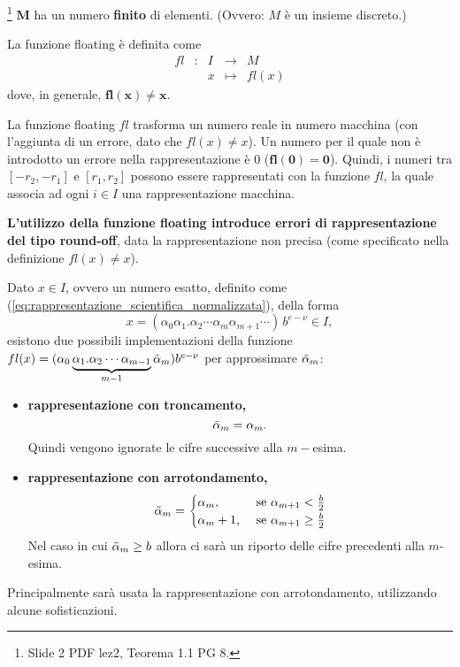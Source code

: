 \begin{theorem}\footnote{Slide 2 PDF lez2, Teorema 1.1 PG 8.}
	$\boldsymbol M$ ha un numero \textbf{finito} di elementi. (Ovvero: $M$ è un insieme discreto.)
\end{theorem}

\begin{definition}
	La funzione floating è definita come
	\begin{equation*}
		\begin{matrix}
			fl&:&I&\rightarrow& M\\
			&&x&\mapsto& fl(x)
		\end{matrix}
	\end{equation*}
	dove, in generale, $\boldsymbol{fl(x)\neq x}$. 
\end{definition}

La funzione floating $fl$ trasforma un numero reale in numero macchina (con l'aggiunta di un errore, dato che $fl(x)\neq x$). Un numero per il quale non è introdotto un errore nella rappresentazione è 0 ($\boldsymbol{fl(0)=0}$). Quindi, i numeri tra $[-r_2,-r_1]$ e $[r_1,r_2]$ possono essere rappresentati con la funzione $fl$, la quale associa ad ogni $i\in I$ una rappresentazione macchina. 

\textbf{L'utilizzo della funzione floating introduce errori di rappresentazione del tipo round-off}, data la rappresentazione non precisa (come specificato nella definizione $fl(x)\neq x$).

Dato $x\in I$, ovvero un numero esatto, definito come (\ref{eq:rappresentazione_scientifica_normalizzata}), della forma 
\begin{equation}\label{eq:numEsatto}
	x=(\alpha_0\alpha_1.\alpha_2\cdots\alpha_m\alpha_{m+1}\cdots)\,b^{e-\nu}\in I,
\end{equation}
esistono due possibili implementazioni della funzione $fl(x)=(\alpha_0\underbrace{\alpha_1.\alpha_2\cdots\alpha_{m-1}}_{m-1}\Tilde{\alpha}_m)b^{e-\nu}$ per approssimare $\Tilde{\alpha}_m$:
\begin{itemize}
	\item \textbf{rappresentazione con troncamento,} \begin{equation}\label{eq:troncamento}
		\Tilde{\alpha}_m=\alpha_m.
	\end{equation}
	Quindi vengono ignorate le cifre successive alla $m-$esima.
	\item \textbf{rappresentazione con arrotondamento,}
	\begin{align}
		\Tilde{\alpha}_m=
		\begin{cases}
			\alpha_m, &\text{ se }\alpha_{m+1}<\frac{b}{2}\\
			\alpha_m+1, &\text{ se }\alpha_{m+1}\geq\frac{b}{2}
		\end{cases}
	\end{align}
	Nel caso in cui $\Tilde{\alpha}_m\geq b$ allora ci sarà un riporto delle cifre precedenti alla $m$-esima.
\end{itemize}
Principalmente sarà usata la rappresentazione con arrotondamento, utilizzando alcune sofisticazioni.

